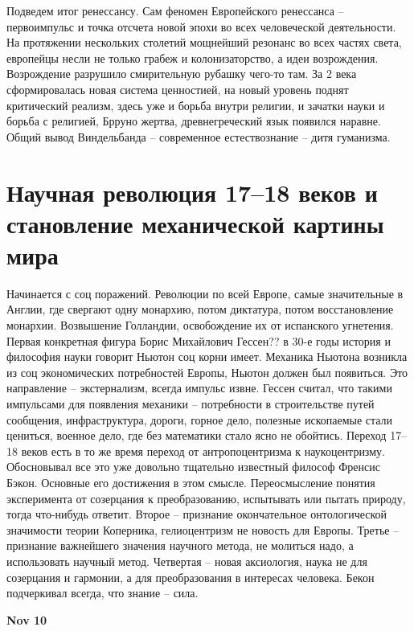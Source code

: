 \documentclass[a4paper, 12pt]{article}
\begin{document}
Подведем итог ренессансу. Сам феномен Европейского ренессанса -- 
первоимпульс и точка отсчета новой эпохи во всех человеческой 
деятельности. На протяжении нескольких столетий мощнейший резонанс во 
всех частях света, европейцы несли не только грабеж и колонизаторство, 
а идеи возрождения. Возрождение разрушило смирительную рубашку чего-то 
там. За 2 века сформировалась новая система ценностией, на новый уровень 
поднят критический реализм, здесь уже и борьба внутри религии, и зачатки 
науки и борьба с религией, Брруно жертва, древнегреческий язык появился 
наравне. Общий вывод Виндельбанда -- современное естествознание -- дитя 
гуманизма.


\section{Научная революция 17--18 веков и становление механической 
картины мира}


Начинается с соц поражений. Революции по всей Европе, самые значительные 
в Англии, где свергают одну монархию, потом диктатура, потом 
восстановление монархии. Возвышение Голландии, освобождение их от 
испанского угнетения. Первая конкретная фигура Борис Михайлович Гессен?? 
в 30-е годы история и философия науки говорит Ньютон соц корни имеет. 
Механика Ньютона возникла из соц экономических потребностей Европы, 
Ньютон должен был появиться. Это направление -- экстернализм, всегда 
импульс извне. Гессен считал, что такими импульсами для появления 
механики -- потребности в строительстве путей сообщения, инфраструктура, 
дороги, горное дело, полезные ископаемые стали цениться, военное дело, 
где без математики стало ясно не обойтись. Переход 17--18 веков есть 
в то же время переход от антропоцентризма к наукоцентризму. Обосновывал 
все это уже довольно тщательно известный философ Френсис Бэкон. Основные 
его достижения в этом смысле. Переосмысление понятия эксперимента от 
созерцания к преобразованию, испытывать или пытать природу, тогда 
что-нибудь ответит. Второе -- признание окончательное онтологической 
значимости теории Коперника, гелиоцентризм не новость для Европы. Третье 
-- признание важнейшего значения научного метода, не молиться надо, 
а использовать научный метод. Четвертая -- новая аксиология, наука не 
для созерцания и гармонии, а для преобразования в интересах человека. 
Бекон подчеркивал всегда, что знание -- сила.

\hfill \textbf{Nov 10}
\end{document}
